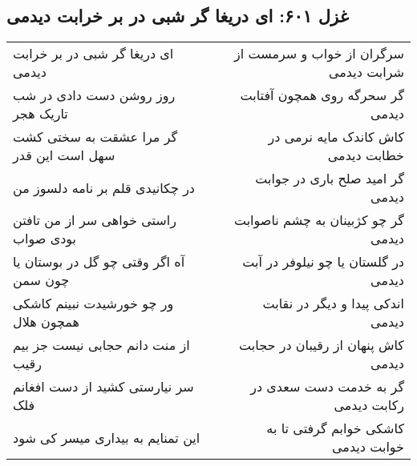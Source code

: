 \begin{center}
\section*{غزل ۶۰۱: ای دریغا گر شبی در بر خرابت دیدمی}
\label{sec:601}
\begin{longtable}{l p{0.5cm} r}
ای دریغا گر شبی در بر خرابت دیدمی
&&
سرگران از خواب و سرمست از شرابت دیدمی
\\
روز روشن دست دادی در شب تاریک هجر
&&
گر سحرگه روی همچون آفتابت دیدمی
\\
گر مرا عشقت به سختی کشت سهل است این قدر
&&
کاش کاندک مایه نرمی در خطابت دیدمی
\\
در چکانیدی قلم بر نامه دلسوز من
&&
گر امید صلح باری در جوابت دیدمی
\\
راستی خواهی سر از من تافتن بودی صواب
&&
گر چو کژبینان به چشم ناصوابت دیدمی
\\
آه اگر وقتی چو گل در بوستان یا چون سمن
&&
در گلستان یا چو نیلوفر در آبت دیدمی
\\
ور چو خورشیدت نبینم کاشکی همچون هلال
&&
اندکی پیدا و دیگر در نقابت دیدمی
\\
از منت دانم حجابی نیست جز بیم رقیب
&&
کاش پنهان از رقیبان در حجابت دیدمی
\\
سر نیارستی کشید از دست افغانم فلک
&&
گر به خدمت دست سعدی در رکابت دیدمی
\\
این تمنایم به بیداری میسر کی شود
&&
کاشکی خوابم گرفتی تا به خوابت دیدمی
\\
\end{longtable}
\end{center}
